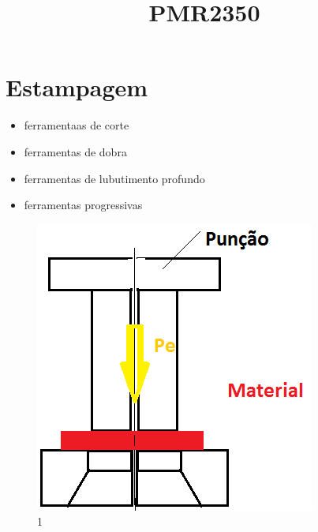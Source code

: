 \documentclass[a4paper, 12pt]{article}
\title{PMR2350}
\begin{document}
\maketitle

\section{Estampagem}

\begin{itemize}
\item ferramentaas de corte
\item ferramentas de dobra
\item ferramentas de lubutimento profundo
\item ferramentas progressivas
\end{itemize}


\begin{figure}[h]
\begin{center}
\includegraphics[scale=0.48]{./fig/1.png}
\caption{\label{fig:1}1} 
\end{center}
\end{figure}
\end{document}
